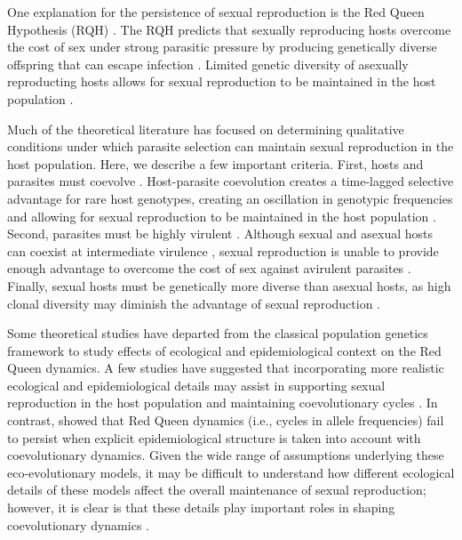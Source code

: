 \documentclass{article}\usepackage[]{graphicx}\usepackage[]{color}
\begin{document}
One explanation for the persistence of sexual reproduction is the Red Queen Hypothesis (RQH) \citep{bell1982masterpiece}.
The RQH predicts that sexually reproducing hosts overcome the cost of sex under strong parasitic pressure by producing genetically diverse offspring that can escape infection \citep{jbs1949disease, jaenike1978hypothesis, hamilton1980sex, hamilton1990sexual}.
Limited genetic diversity of asexually reproducting hosts allows for sexual reproduction to be maintained in the host population \citep{ashby2015diversity}.

Much of the theoretical literature has focused on determining qualitative conditions under which parasite selection can maintain sexual reproduction in the host population.
Here, we describe a few important criteria.
First, hosts and parasites must coevolve \citep{bell1982masterpiece}.
Host-parasite coevolution creates a time-lagged selective advantage for rare host genotypes, creating an oscillation in genotypic frequencies and allowing for sexual reproduction to be maintained in the host population \citep{clarke1976ecological,jaenike1978hypothesis, hamilton1980sex, agrawal2001parasites}.
Second, parasites must be highly virulent \citep{may1983epidemiology}.
Although sexual and asexual hosts can coexist at intermediate virulence \citep{howard1994parasitism}, sexual reproduction is unable to provide enough advantage to overcome the cost of sex against avirulent parasites \citep{howard1994parasitism}.
Finally, sexual hosts must be genetically more diverse than asexual hosts, as high clonal diversity may diminish the advantage of sexual reproduction \citep{lively1994selection, lively2010review, ashby2015diversity}.

Some theoretical studies have departed from the classical population genetics framework to study effects of ecological and epidemiological context on the Red Queen dynamics.
A few studies have suggested that incorporating more realistic ecological and epidemiological details may assist in supporting sexual reproduction in the host population \citep{lively2009maintenance, lively2010epidemiological} and maintaining coevolutionary cycles \citep{ashby2014parasitic}.
In contrast, \cite{macpherson2018joint} showed that Red Queen dynamics (i.e., cycles in allele frequencies) fail to persist when explicit epidemiological structure is taken into account with coevolutionary dynamics.
Given the wide range of assumptions underlying these eco-evolutionary models, it may be difficult to understand how different ecological details of these models affect the overall maintenance of sexual reproduction;
however, it is clear is that these details play important roles in shaping coevolutionary dynamics \citep{song2015host, ashby2019understanding, haafke2016eco}.
\end{document}
